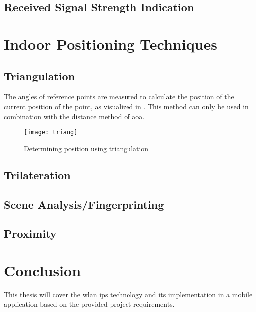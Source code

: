 \subsection{Received Signal Strength Indication}
\section{Indoor Positioning Techniques}
\subsection{Triangulation}
The angles of reference points are measured to calculate the position of the current position of the point, as visualized in \cite{fig:triang}. This method can only be used in combination with the distance method of \acrlong{aoa}.
\begin{figure}[h!]
\centering
\texttt{[image: triang]}
\caption{Determining position using triangulation ~\cite{Loy2018}}
\label{fig:triang}
\end{figure}
\subsection{Trilateration}
\subsection{Scene Analysis/Fingerprinting}
\subsection{Proximity}
\section{Conclusion}
This thesis will cover the \acrshort{wlan} \acrlong{ips} technology and its implementation in a mobile application based on the provided project requirements.
